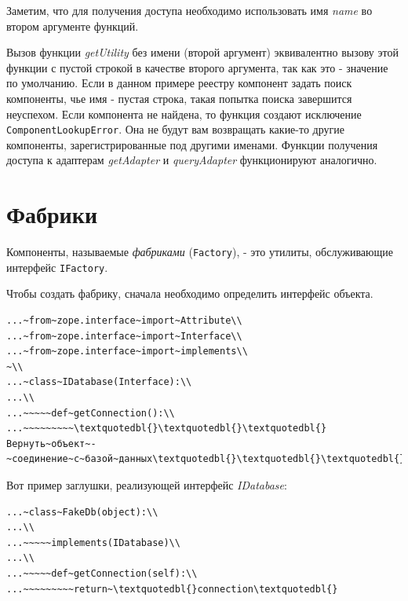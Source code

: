\documentclass[a4paper,openany,twoside,draft]{book}
\providecommand*{\DUroletitlereference}[1]{\textsl{#1}}
\begin{document}
Заметим, что для получения доступа необходимо использовать имя \DUroletitlereference{name}
во втором аргументе функций.

Вызов функции \DUroletitlereference{getUtility} без имени (второй аргумент) эквивалентно
вызову этой функции с пустой строкой в качестве второго аргумента, так
как это - значение по умолчанию.  Если в данном примере реестру
компонент задать поиск компоненты, чье имя - пустая строка, такая
попытка поиска завершится неуспехом.  Если компонента не найдена, то
функция создают исключение \texttt{ComponentLookupError}.  Она не будут вам
возвращать какие-то другие компоненты, зарегистрированные под другими
именами.  Функции получения доступа к адаптерам \DUroletitlereference{getAdapter} и
\DUroletitlereference{queryAdapter} функционируют аналогично.


\section{Фабрики%
  \label{id43}%
}

Компоненты, называемые \DUroletitlereference{фабриками} (\texttt{Factory}), - это утилиты,
обслуживающие интерфейс \texttt{IFactory}.

Чтобы создать фабрику, сначала необходимо определить интерфейс
объекта.

\begin{verbatim}
...~from~zope.interface~import~Attribute\\
...~from~zope.interface~import~Interface\\
...~from~zope.interface~import~implements\\
~\\
...~class~IDatabase(Interface):\\
...\\
...~~~~~def~getConnection():\\
...~~~~~~~~~\textquotedbl{}\textquotedbl{}\textquotedbl{}Вернуть~объект~-~соединение~с~базой~данных\textquotedbl{}\textquotedbl{}\textquotedbl{}
\end{verbatim}

Вот пример заглушки, реализующей интерфейс \DUroletitlereference{IDatabase}:

\begin{verbatim}
...~class~FakeDb(object):\\
...\\
...~~~~~implements(IDatabase)\\
...\\
...~~~~~def~getConnection(self):\\
...~~~~~~~~~return~\textquotedbl{}connection\textquotedbl{}
\end{verbatim}
\end{document}
